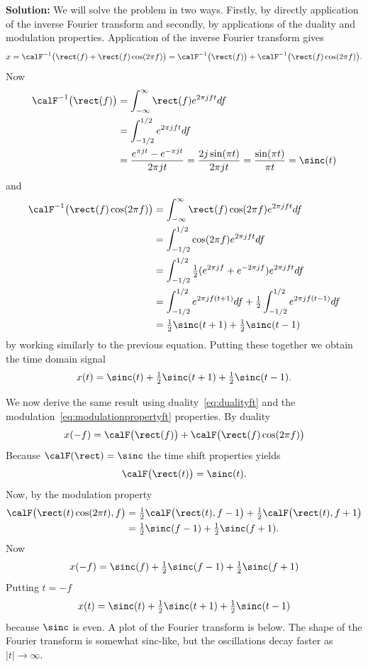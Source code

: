 \documentclass[11pt,a4paper]{book}
\theoremstyle{plain}
\numberwithin{equation}{section}
\newcommand{\abs}[1]{\left\vert #1 \right\vert}
\newenvironment{solution}{\begin{footnotesize}\textbf{Solution:}}{\end{footnotesize}}
\newenvironment{excersizelist}{%
  \renewcommand*{\theenumi}{\thechapter.\arabic{enumi}}%
  \newcommand\itemadvanced{\stepcounter{enumi}\item[$\ast$\, \theenumi.]}
  \begin{enumerate}
}{%
  \end{enumerate}
}
\begin{document}
\begin{excersizelist}
\begin{solution}
We will solve the problem in two ways.  Firstly, by directly application of the inverse Fourier transform and secondly, by applications of the duality and modulation properties.  Application of the inverse Fourier transform gives
\[
x = \calF^{-1}\big(\rect(f) + \rect(f)\cos(2\pi f)\big) = \calF^{-1}\big(\rect(f)\big) + \calF^{-1}\big(\rect(f)\cos(2\pi f)\big).
\]
Now
\begin{align*}
\calF^{-1}\big(\rect(f)\big) &= \int_{-\infty}^\infty \rect(f) e^{2\pi j f t} df \\
&=\int_{-1/2}^{1/2} e^{2\pi j  f t} df \\
&= \frac{e^{\pi j t} - e^{-\pi j t}}{2\pi j t} = \frac{2j \sin(\pi t)}{2 \pi j t} =  \frac{\sin(\pi t)}{\pi t} = \sinc(t) 
\end{align*}
and
\begin{align*}
\calF^{-1}\big(\rect(f)\cos(2\pi f)\big) &= \int_{-\infty}^\infty \rect(f)\cos(2\pi f) e^{2\pi j f t} df \\
&= \int_{-1/2}^{1/2} \cos(2\pi f) e^{2\pi j  f t} df \\
&= \int_{-1/2}^{1/2} \tfrac{1}{2} (e^{2\pi j f} + e^{-2\pi j f}) e^{2\pi j f t} df \\
&= \int_{-1/2}^{1/2} e^{2 \pi j f (t + 1)} df + \tfrac{1}{2} \int_{-1/2}^{1/2} e^{2 \pi j f (t - 1)} df \\
&= \tfrac{1}{2}\sinc(t + 1) + \tfrac{1}{2}\sinc(t-1)
\end{align*}
by working similarly to the previous equation.  Putting these together we obtain the time domain signal
\[
x(t) = \sinc(t) + \tfrac{1}{2}\sinc(t + 1) + \tfrac{1}{2}\sinc(t-1).
\] 

We now derive the same result using duality~\eqref{eq:dualityft} and the modulation~\eqref{eq:modulationpropertyft} properties.  By duality
\[
x(-f) = \calF\big(\rect(f)\big) + \calF\big(\rect(f)\cos(2\pi f)\big)
\]
Because $\calF(\rect) = \sinc$  the time shift properties yields
\[
\calF\big(\rect(t)\big) = \sinc(t).
\]
Now, by the modulation property
\begin{align*}
\calF\big(\rect(t)\cos(2\pi t), f\big) &= \tfrac{1}{2}\calF\big(\rect(t), f - 1\big) + \tfrac{1}{2}\calF\big(\rect(t), f + 1\big) \\
&= \tfrac{1}{2}\sinc(f - 1) + \tfrac{1}{2}\sinc(f + 1).
\end{align*}
Now
\[
x(-f) = \sinc(f) + \tfrac{1}{2}\sinc(f - 1) + \tfrac{1}{2}\sinc(f + 1)
\]
Putting $t = -f$
\[
x(t) = \sinc(t) + \tfrac{1}{2}\sinc(t + 1) + \tfrac{1}{2}\sinc(t - 1)
\] 
because $\sinc$ is even.  A plot of the Fourier transform is below.  The shape of the Fourier transform is somewhat sinc-like, but the oscillations decay faster as $\abs{t} \to \infty$.


\end{solution}
\end{excersizelist}
\end{document}
